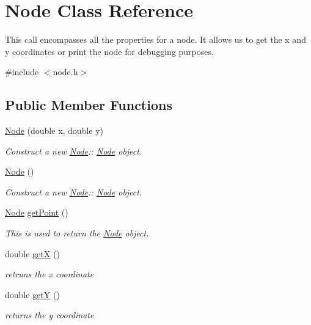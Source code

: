 \hypertarget{classNode}{}\section{Node Class Reference}
\label{classNode}


This call encompasses all the properties for a node. It allows us to get the x and y coordinates or print the node for debugging purposes.  




{\ttfamily \#include $<$node.\+h$>$}

\subsection*{Public Member Functions}
\begin{DoxyCompactItemize}
\item 
\hyperlink{classNode_ab488e53f2acfc84ef0cacc1951f92c3d}{Node} (double x, double y)
\begin{DoxyCompactList}\small\item\em Construct a new \hyperlink{classNode}{Node}\+:\+: \hyperlink{classNode}{Node} object. \end{DoxyCompactList}\item 
\mbox{\label{classNode_ad7a34779cad45d997bfd6d3d8043c75f}} 
\hyperlink{classNode_ad7a34779cad45d997bfd6d3d8043c75f}{Node} ()
\begin{DoxyCompactList}\small\item\em Construct a new \hyperlink{classNode}{Node}\+:\+: \hyperlink{classNode}{Node} object. \end{DoxyCompactList}\item 
\hyperlink{classNode}{Node} \hyperlink{classNode_a667cd139237fd82f1d4d6e784310c42d}{get\+Point} ()
\begin{DoxyCompactList}\small\item\em This is used to return the \hyperlink{classNode}{Node} object. \end{DoxyCompactList}\item 
double \hyperlink{classNode_a8d8ccf6a6da7717ea6aa67e52c7c9017}{getX} ()
\begin{DoxyCompactList}\small\item\em retruns the x coordinate \end{DoxyCompactList}\item 
double \hyperlink{classNode_a8877121bf44537ccbe2f3c441fa3b664}{getY} ()
\begin{DoxyCompactList}\small\item\em returns the y coordinate \end{DoxyCompactList}\item 

\end{DoxyCompactItemize}
